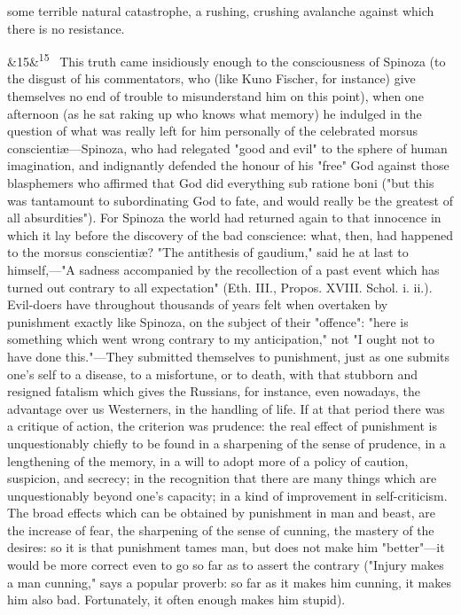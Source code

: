 \documentclass[12pt]{article}
\newcommand{\para}[1][]{\par\noindent\ifx&#1&\else\textsuperscript{\footnotesize #1}~\fi}
\begin{document}
some terrible natural catastrophe, a rushing, crushing avalanche against which there is no resistance.

\para[15] This truth came insidiously enough to the consciousness of Spinoza (to the disgust of his commentators, who (like Kuno Fischer, for instance) give themselves no end of trouble to misunderstand him on this point), when one afternoon (as he sat raking up who knows what memory) he indulged in the question of what was really left for him personally of the celebrated morsus conscientiæ---Spinoza, who had relegated "good and evil" to the sphere of human imagination, and indignantly defended the honour of his "free" God against those blasphemers who affirmed that God did everything sub ratione boni ("but this was tantamount to subordinating God to fate, and would really be the greatest of all absurdities"). For Spinoza the world had returned again to that innocence in which it lay before the discovery of the bad conscience: what, then, had happened to the morsus conscientiæ? "The antithesis of gaudium," said he at last to himself,---"A sadness accompanied by the recollection of a past event which has turned out contrary to all expectation" (Eth. III., Propos. XVIII. Schol. i. ii.). Evil-doers have throughout thousands of years felt when overtaken by punishment exactly like Spinoza, on the subject of their "offence": "here is something which went wrong contrary to my anticipation," not "I ought not to have done this."---They submitted themselves to punishment, just as one submits one's self to a disease, to a misfortune, or to death, with that stubborn and resigned fatalism which gives the Russians, for instance, even nowadays, the advantage over us Westerners, in the handling of life. If at that period there was a critique of action, the criterion was prudence: the real effect of punishment is unquestionably chiefly to be found in a sharpening of the sense of prudence, in a lengthening of the memory, in a will to adopt more of a policy of caution, suspicion, and secrecy; in the recognition that there are many things which are unquestionably beyond one's capacity; in a kind of improvement in self-criticism. The broad effects which can be obtained by punishment in man and beast, are the increase of fear, the sharpening of the sense of cunning, the mastery of the desires: so it is that punishment tames man, but does not make him "better"---it would be more correct even to go so far as to assert the contrary ("Injury makes a man cunning," says a popular proverb: so far as it makes him cunning, it makes him also bad. Fortunately, it often enough makes him stupid).
\end{document}
